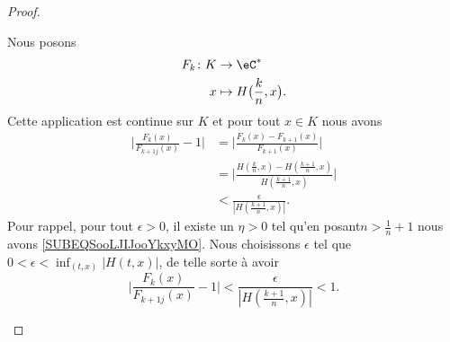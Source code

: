 \begin{proof}
\begin{subproof}
        Nous posons
        \begin{equation}
            \begin{aligned}
                F_k\colon K&\to \eC^* \\
                x&\mapsto H\big( \frac{ k }{ n },x \big). 
            \end{aligned}
        \end{equation}
        Cette application est continue sur \( K\) et pour tout \( x\in K\) nous avons
        \begin{subequations}        \label{SUBEQSooLJIJooYkxyMO}
            \begin{align}
                \big| \frac{ F_k(x) }{ F_{k+1j}(x) }-1 \big|&=\big| \frac{ F_k(x)-F_{k+1}(x) }{ F_{k+1}(x) } \big|\\
                &=\big| \frac{ H(\frac{ k }{ n },x)-H(\frac{ k+1 }{ n },x) }{ H(\frac{ k+1 }{ n },x) } \big|\\
                &<\frac{ \epsilon }{ | H(\frac{ k+1 }{ n },x) | }.
            \end{align}
        \end{subequations}
        Pour rappel, pour tout \( \epsilon>0\), il existe un \( \eta>0\) tel qu'en posant\( n>\frac{1}{ n }+1\) nous avons \eqref{SUBEQSooLJIJooYkxyMO}. Nous choisissons \( \epsilon\) tel que \( 0<\epsilon<\inf_{(t,x)}| H(t,x) |\), de telle sorte à avoir
        \begin{equation}
            \big| \frac{ F_k(x) }{ F_{k+1j}(x) }-1 \big|<\frac{ \epsilon }{ | H(\frac{ k+1 }{ n },x) | }<1.
        \end{equation}
        

\end{subproof}
\end{proof}
